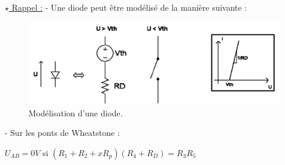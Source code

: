 \underline{$\star$ Rappel :} 
- Une diode peut être modélisé de la manière suivante : 
\begin{figure}[H]
    \begin{center}
        \includegraphics*[scale=0.5]{images/2.png}
        \caption{\label{figure 2} Modélisation d'une diode.}
    \end{center}
\end{figure}
- Sur les ponts de Wheatstone :

$U_{AB} = 0V$ si $(R_1+R_2+xR_p)(R_4+R_D)=R_3R_5$

